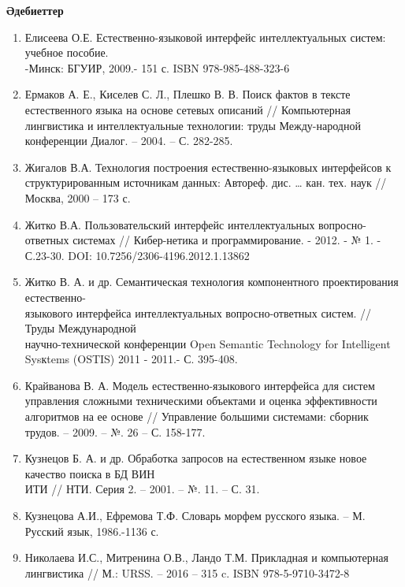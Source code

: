 \begin{center}
  {\bfseries Әдебиеттер}
  \end{center}

\begin{noparindent}

\begin{enumerate}
\def\labelenumi{\arabic{enumi}.}
\item
  Елисеева О.Е. Естественно-языковой интерфейс интеллектуальных систем:
  учебное пособие. \\-Минск: БГУИР, 2009.- 151 с. ISBN 978-985-488-323-6
\item
  Ермаков А. Е., Киселев С. Л., Плешко В. В. Поиск фактов в тексте
  естественного языка на основе сетевых описаний // Компьютерная
  лингвистика и интеллектуальные технологии: труды Между-народной
  конференции Диалог. -- 2004. -- С. 282-285.
\item
  Жигалов В.А. Технология построения естественно-языковых интерфейсов к
  структурированным источникам данных: Автореф. дис. \ldots{} кан. тех.
  наук // Москва, 2000 -- 173 с.
\item
  Житко В.А. Пользовательский интерфейс интеллектуальных
  вопросно-ответных системах // Кибер-нетика и программирование. - 2012.
  - № 1. - С.23-30. DOI: 10.7256/2306-4196.2012.1.13862
\item
  Житко В. А. и др. Семантическая технология компонентного
  проектирования естественно-\\языкового интерфейса интеллектуальных
  вопросно-ответных систем. // Труды Международной \\научно-технической
  конференции Open Semantic Technology for Intelligent Sysкtems (OSTIS)
  2011 - 2011.- С. 395-408.
\item
  Крайванова В. А. Модель естественно-языкового интерфейса для систем
  управления сложными техническими объектами и оценка эффективности
  алгоритмов на ее основе // Управление большими системами: сборник
  трудов. -- 2009. -- №. 26 -- С. 158-177.
\item
  Кузнецов Б. А. и др. Обработка запросов на естественном языке новое
  качество поиска в БД ВИН\\ИТИ // НТИ. Серия 2. -- 2001. -- №. 11. -- С.
  31.
\item
  Кузнецова А.И., Ефремова Т.Ф. Словарь морфем русского языка. -- М.
  Русский язык, 1986.-1136 с.
\item
  Николаева И.С., Митренина О.В., Ландо Т.М. Прикладная и компьютерная
  лингвистика // М.: URSS. -- 2016 -- 315 c. ISBN 978-5-9710-3472-8

\end{enumerate}
\end{noparindent}
